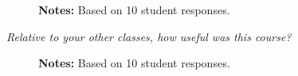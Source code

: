 \begin{boenumerate}
\begin{figure}[h!]\centering
{}\hspace{0.75cm}
\begin{center}
\begin{minipage}[t]{0.85\columnwidth}\vspace{-0.75cm}
\item\scriptsize{\textbf{Notes:} Based on 10 student responses. }
\end{minipage}
\end{center}
\end{figure}
\newpage
\item \textit{Relative to your other classes, how useful was this course?}

\begin{figure}[h!]\centering
{}\hspace{0.75cm}
\begin{center}
\begin{minipage}[t]{0.85\columnwidth}\vspace{-0.75cm}
\item\scriptsize{\textbf{Notes:} Based on 10 student responses. }
\end{minipage}
\end{center}
\end{figure}


\end{boenumerate}

